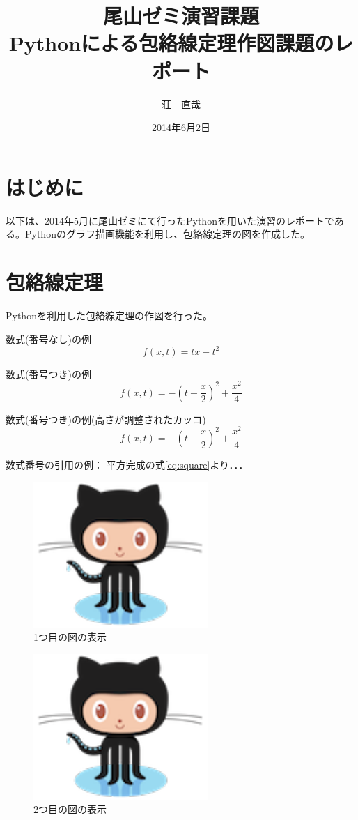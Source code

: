 \documentclass[11pt,a4j,fleqn]{jarticle}
\title{尾山ゼミ演習課題\\Pythonによる包絡線定理作図課題のレポート}
\author{荘　直哉}
\date{2014年6月2日}
\begin{document}
\maketitle

\section{はじめに}

以下は、2014年5月に尾山ゼミにて行ったPythonを用いた演習のレポートである。Pythonのグラフ描画機能を利用し、包絡線定理の図を作成した。


\section{包絡線定理}


Pythonを利用した包絡線定理の作図を行った。



数式(番号なし)の例
\[
f(x, t) = t x - t^2
\]


数式(番号つき)の例
\begin{equation}
f(x, t)  = -(t - \frac{x}{2})^2 + \frac{x^2}{4} \label{eq:square}
\end{equation}

数式(番号つき)の例(高さが調整されたカッコ)
\begin{equation}
f(x, t) = -\left(t - \frac{x}{2}\right)^2 + \frac{x^2}{4} \label{eq:square-2}
\end{equation}



数式番号の引用の例：
平方完成の式\eqref{eq:square}より．．．

\begin{figure}
 \centering
 \includegraphics{envelope0.pdf}
 \caption{1つ目の図の表示}
 \label{fig:1}
\end{figure}

\begin{figure}
 \centering
 \includegraphics{envelope1.pdf}
 \caption{2つ目の図の表示}
 \label{fig:2}
\end{figure}
\end{document}
